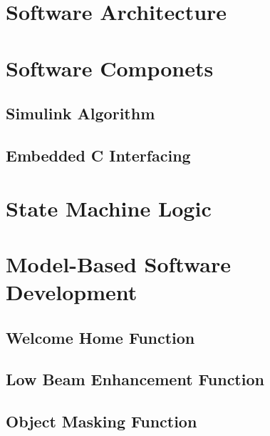 \begin{comment}
\newpage
\subsection*{Discussion}
\begin{itemize}
	\item Discussion of approach, methods (pro and con)
	\item Results, findings and their discussion with respect to objectives
	\item Explanation of deviations
	\item Your opinion about the result
\end{itemize}

    
\end{comment}

\section{Software Architecture}

\section{Software Componets}
\subsection{Simulink Algorithm}
\subsection{Embedded C Interfacing}

\section{State Machine Logic}

\section{Model-Based Software Development}
\subsection{Welcome Home Function}
\subsection{Low Beam Enhancement Function}
\subsection{Object Masking Function}

